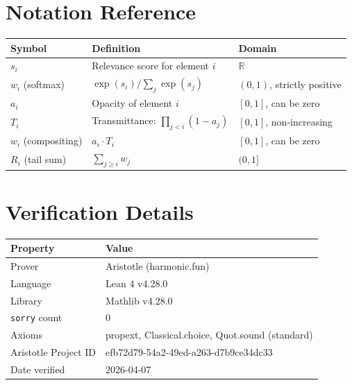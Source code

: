 \documentclass[twoside,11pt]{article}
\begin{document}
\section{Notation Reference}
\label{app:notation}

\begin{center}
\begin{tabular}{lll}
\toprule
Symbol & Definition & Domain \\
\midrule
$s_i$ & Relevance score for element $i$ & $\mathbb{R}$ \\
$w_i$ (softmax) & $\exp(s_i) / \sum_j \exp(s_j)$ & $(0, 1)$, strictly positive \\
$a_i$ & Opacity of element $i$ & $[0, 1]$, can be zero \\
$T_i$ & Transmittance: $\prod_{j<i} (1 - a_j)$ & $[0, 1]$, non-increasing \\
$w_i$ (compositing) & $a_i \cdot T_i$ & $[0, 1]$, can be zero \\
$R_i$ (tail sum) & $\sum_{j \geq i} w_j$ & $(0, 1]$ \\
\bottomrule
\end{tabular}
\end{center}

\section{Verification Details}
\label{app:verification}

\begin{center}
\begin{tabular}{ll}
\toprule
Property & Value \\
\midrule
Prover & Aristotle (harmonic.fun) \\
Language & Lean 4 v4.28.0 \\
Library & Mathlib v4.28.0 \\
\texttt{sorry} count & 0 \\
Axioms & propext, Classical.choice, Quot.sound (standard) \\
Aristotle Project ID & efb72d79-54a2-49ed-a263-d7b9ce34dc33 \\
Date verified & 2026-04-07 \\
\bottomrule
\end{tabular}
\end{center}
\end{document}
